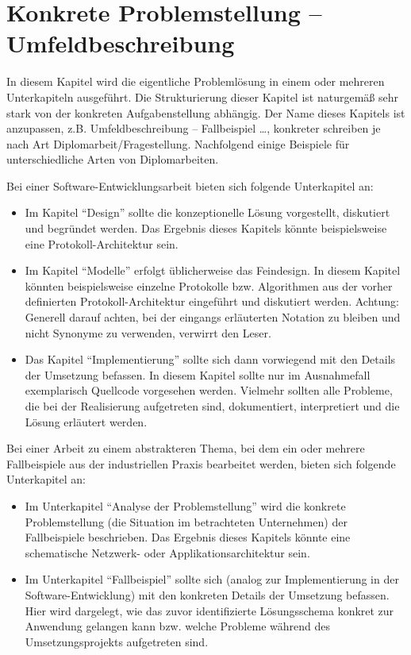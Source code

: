 \chapter{Konkrete Problemstellung -- Umfeldbeschreibung}
\label{sec:problemdescription}

In diesem Kapitel wird die eigentliche Problemlösung in einem oder mehreren Unterkapiteln ausgeführt. Die Strukturierung dieser Kapitel ist naturgemäß sehr stark von der konkreten Aufgabenstellung abhängig. Der Name dieses Kapitels ist anzupassen, z.B. Umfeldbeschreibung -- Fallbeispiel \dots, konkreter schreiben je nach Art Diplomarbeit/Fragestellung.
\makeatletter\ifthesis@masterthesis
Nachfolgend einige Beispiele für unterschiedliche Arten von Diplomarbeiten.

Bei einer Software-Entwicklungsarbeit bieten sich folgende Unterkapitel an:
\begin{itemize}
	\item Im Kapitel \enquote{Design} sollte die konzeptionelle Lösung vorgestellt, diskutiert und begründet werden. Das Ergebnis dieses Kapitels könnte beispielsweise eine Protokoll-Architektur sein.
	\item Im Kapitel \enquote{Modelle} erfolgt üblicherweise das Feindesign. In diesem Kapitel könnten beispielsweise einzelne Protokolle bzw. Algorithmen aus der vorher definierten Protokoll-Architektur eingeführt und diskutiert werden. Achtung: Generell darauf achten, bei der eingangs erläuterten Notation zu bleiben und nicht Synonyme zu verwenden, verwirrt den Leser.
	\item Das Kapitel \enquote{Implementierung} sollte sich dann vorwiegend mit den Details der Umsetzung befassen. In diesem Kapitel sollte nur im Ausnahmefall exemplarisch Quellcode vorgesehen werden. Vielmehr sollten alle Probleme, die bei der Realisierung aufgetreten sind, dokumentiert, interpretiert und die Lösung erläutert werden.
\end{itemize}

Bei einer Arbeit zu einem abstrakteren Thema, bei dem ein oder mehrere Fallbeispiele aus der industriellen Praxis bearbeitet werden, bieten sich folgende Unterkapitel an:
\begin{itemize}
	\item Im Unterkapitel \enquote{Analyse der Problemstellung} wird die konkrete Problemstellung (die Situation im betrachteten Unternehmen) der Fallbeispiele beschrieben. Das Ergebnis dieses Kapitels könnte eine schematische Netzwerk- oder Applikationsarchitektur sein.
	\item Im Unterkapitel \enquote{Fallbeispiel} sollte sich (analog zur Implementierung in der Software-Entwicklung) mit den konkreten Details der Umsetzung befassen. Hier wird dargelegt, wie das zuvor identifizierte Lösungsschema konkret zur Anwendung gelangen kann bzw. welche Probleme während des Umsetzungsprojekts aufgetreten sind.
\end{itemize}

